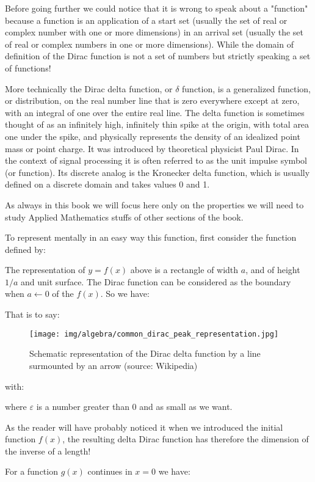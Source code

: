 	Before going further we could notice that it is wrong to speak about a "function" because a function is an application of a start set (usually the set of real or complex number with one or more dimensions) in an arrival set (usually the set of real or complex numbers in one or more dimensions). While the domain of definition of the Dirac function is not a set of numbers but strictly speaking a set of functions!
	
	More technically the Dirac delta function, or $\delta$ function, is a generalized function, or distribution, on the real number line that is zero everywhere except at zero, with an integral of one over the entire real line. The delta function is sometimes thought of as an infinitely high, infinitely thin spike at the origin, with total area one under the spike, and physically represents the density of an idealized point mass or point charge. It was introduced by theoretical physicist Paul Dirac. In the context of signal processing it is often referred to as the unit impulse symbol (or function). Its discrete analog is the Kronecker delta function, which is usually defined on a discrete domain and takes values 0 and 1.
	
	As always in this book we will focus here only on the properties we will need to study Applied Mathematics stuffs of other sections of the book.
	
	To represent mentally in an easy way this function, first consider the function defined by:
	
	The representation of $y=f(x)$ above is a rectangle of width $a$, and of height $1/ a$ and unit surface. The Dirac function can be considered as the boundary when $a\leftarrow 0$ of the  $f (x)$. So we have:		
	
	That is to say:
	\begin{figure}[H]
		\centering
		\texttt{[image: img/algebra/common\_dirac\_peak\_representation.jpg]}
		\caption{Schematic representation of the Dirac delta function by a line surmounted by an arrow (source: Wikipedia)}
	\end{figure}
	with:
	
	where $\varepsilon$ is a number greater than $0$ and as small as we want.
	\begin{tcolorbox}[title=Remark,colframe=black,arc=10pt]
		As the reader will have probably noticed it when we introduced the initial function $f (x)$, the resulting delta Dirac function has therefore the dimension of the inverse of a length!
	\end{tcolorbox}
	For a function $g (x)$ continues in $x = 0$ we have:
	
